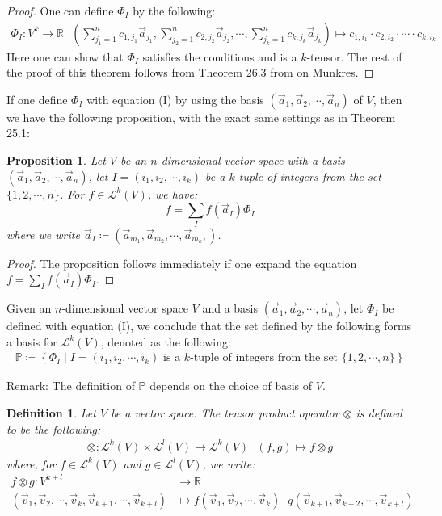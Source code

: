 \documentclass[15pt]{book}
\theoremstyle{break}
\theoremstyle{break}
\newtheorem{prop}[lem]{Proposition}
\newtheorem{defn}{Definition}[corL]
\newcommand{\R}{\mathbb{R}}
\newcommand{\Lt}{\mathcal{L}}
\newcommand{\lr}[1]{\left(#1\right)}
\newcommand{\remark}{\color{blue}Remark: \color{black}}
\begin{document}
\begin{proof}
One can define $\Phi_I$ by the following:
\begin{align*}
\Phi_I:V^k \to \R \ \ \ \lr{\sum_{j_1=1}^n c_{1,j_1} \vec{a}_{j_1}, \sum_{j_2=1}^n c_{2,j_2} \vec{a}_{j_2}, \cdots, \sum_{j_k=1}^n c_{k,j_k} \vec{a}_{j_k}}\mapsto c_{1,i_1}\cdot c_{2,i_2} \cdot \cdots \cdot c_{k,i_k}  \tag{I}
\end{align*}
Here one can show that $\Phi_I$ satisfies the conditions and is a $k$-tensor. The rest of the proof of this theorem follows from Theorem 26.3 from on Munkres. 
\end{proof}
\newpage

If one define $\Phi_I$ with equation (I) by using the basis $(\vec{a}_1,\vec{a}_2,\cdots, \vec{a}_n)$ of $V$, then we have the following proposition, with the exact same settings as in Theorem 25.1:
\begin{prop}
Let $V$ be an $n$-dimensional vector space with a basis $(\vec{a}_1,\vec{a}_2,\cdots, \vec{a}_n)$, let $I = (i_1,i_2,\cdots, i_k)$ be a $k$-tuple of integers from the set $\{1,2,\cdots, n\}$. For $f \in \Lt^k(V)$, we have: 
$$f = \sum_I f(\vec{a}_I) \Phi_I$$ 
where we write $\vec{a}_I \coloneqq \left(\vec{a}_{m_1},\vec{a}_{m_2},\cdots, \vec{a}_{m_k},\right)$.
\end{prop}

\begin{proof}
The proposition follows immediately if one expand the equation $f = \sum_I f(\vec{a}_I) \Phi_I$.
\end{proof}

Given an $n$-dimensional vector space $V$ and a basis $(\vec{a}_1,\vec{a}_2,\cdots, \vec{a}_n)$, let $\Phi_I$ be defined with equation (I), we conclude that the set defined by the following forms a basis for $\Lt^k(V)$, denoted as the following:
\begin{align*}
\mathbb{P} \coloneqq \left\{ \Phi_I \mid I = (i_1,i_2,\cdots, i_k) \text{ is a }k\text{-tuple of integers from the set } \{1,2,\cdots, n\} \right\}
\tag{P}
\end{align*}

\remark The definition of $\mathbb{P}$ depends on the choice of basis of $V$. 

\begin{defn}
Let $V$ be a vector space. The tensor product operator $\otimes$ is defined to be the following:
\begin{align*}
\otimes: \Lt^k(V)\times \Lt^l(V) \to \Lt^k(V) \ \ \ (f,g)\mapsto f\otimes g
\end{align*}
where, for $f\in \Lt^k(V)$ and $g \in \Lt^l(V)$, we write:
\begin{align*}
f\otimes g : V^{k+l} &\to \R\\
(\vec{v}_1,\vec{v}_2,\cdots, \vec{v}_k, \vec{v}_{k+1},\cdots, \vec{v}_{k+l})&\mapsto f(\vec{v}_1,\vec{v}_2,\cdots, \vec{v}_k)\cdot g(\vec{v}_{k+1},\vec{v}_{k+2}, \cdots, \vec{v}_{k+l} )
\end{align*}
\end{defn}
\end{document}
